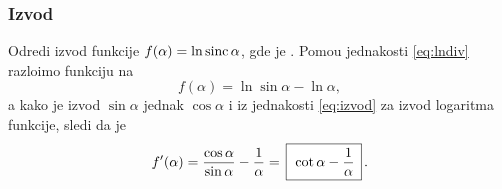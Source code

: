 \subsubsection{Izvod}

\def\sinc{\mathop{\rm sinc}}
\zadatak Odredi izvod funkcije $f(\alpha)=\ln\sinc\alpha$, gde je  
\smash{$\displaystyle{\sinc\alpha=\frac{\sin\alpha}{\alpha}}$}.
\resenje Pomo{\cc}u jednakosti \eqref{eq:lndiv} razlo{\zv}imo funkciju na 
$$f(\alpha)=\ln\sin\alpha-\ln\alpha,$$ 
a kako je izvod $\sin\alpha$ jednak $\cos\alpha$ i iz jednakosti 
\eqref{eq:izvod} za izvod logaritma funkcije, sledi da je
$$
f'(\alpha)
=\frac{\cos\alpha}{\sin\alpha} - \frac1\alpha
=\ram{\cot\alpha - \frac1\alpha}.
$$

